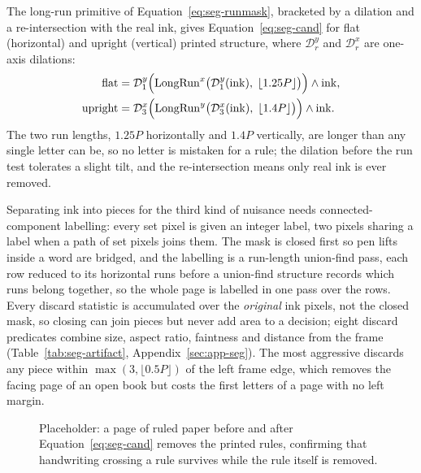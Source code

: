 The long-run primitive of Equation~\ref{eq:seg-runmask}, bracketed by a dilation and a re-intersection with the real ink, gives Equation~\ref{eq:seg-cand} for flat (horizontal) and upright (vertical) printed structure, where $\mathcal D_r^{y}$ and $\mathcal D_r^{x}$ are one-axis dilations:
\begin{equation}
\begin{aligned}
\mathrm{flat}&=\mathcal D_{1}^{y}\Bigl(\mathrm{LongRun}^{x}\bigl(\mathcal D_{1}^{y}(\mathrm{ink}),\;\lfloor1.25P\rfloor\bigr)\Bigr)\wedge\mathrm{ink},\\
\mathrm{upright}&=\mathcal D_{3}^{x}\Bigl(\mathrm{LongRun}^{y}\bigl(\mathcal D_{3}^{x}(\mathrm{ink}),\;\lfloor1.4P\rfloor\bigr)\Bigr)\wedge\mathrm{ink}.
\end{aligned}
\label{eq:seg-cand}
\end{equation}
The two run lengths, $1.25P$ horizontally and $1.4P$ vertically, are longer than any single letter can be, so no letter is mistaken for a rule; the dilation before the run test tolerates a slight tilt, and the re-intersection means only real ink is ever removed.

Separating ink into pieces for the third kind of nuisance needs connected-component labelling: every set pixel is given an integer label, two pixels sharing a label when a path of set pixels joins them. The mask is closed first so pen lifts inside a word are bridged, and the labelling is a run-length union-find pass, each row reduced to its horizontal runs before a union-find structure records which runs belong together, so the whole page is labelled in one pass over the rows. Every discard statistic is accumulated over the \emph{original} ink pixels, not the closed mask, so closing can join pieces but never add area to a decision; eight discard predicates combine size, aspect ratio, faintness and distance from the frame (Table~\ref{tab:seg-artifact}, Appendix~\ref{sec:app-seg}). The most aggressive discards any piece within $\max(3,\lfloor0.5P\rfloor)$ of the left frame edge, which removes the facing page of an open book but costs the first letters of a page with no left margin.

\begin{figure}[htb]
\centering
{}
\captionsetup{singlelinecheck=false,justification=justified}
\caption{Placeholder: a page of ruled paper before and after Equation~\ref{eq:seg-cand} removes the printed rules, confirming that handwriting crossing a rule survives while the rule itself is removed.}
\label{fig:seg-rules}
\end{figure}

